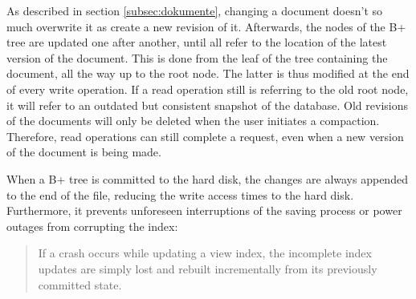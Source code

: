 As described in section \ref{subsec:dokumente}, changing a document doesn't so much overwrite it as create a new revision of it. Afterwards, the nodes of the B+ tree are updated one after another, until all refer to the location of the latest version of the document. This is done from the leaf of the tree containing the document, all the way up to the root node. The latter is thus modified at the end of every write operation. If a read operation still is referring to the old root node, it will refer to an outdated but consistent snapshot of the database. Old revisions of the documents will only be deleted when the user initiates a compaction. Therefore, read operations can still complete a request, even when a new version of the document is being made.

When a B+ tree is committed to the hard disk, the changes are always appended to the end of the file, reducing the write access times to the hard disk. Furthermore, it prevents unforeseen interruptions of the saving process or power outages from corrupting the index:

\begin{quote}
If a crash occurs while updating a view index, the incomplete index updates are simply lost and rebuilt incrementally from its previously committed state. \cite{couch:overview}
\end{quote}
